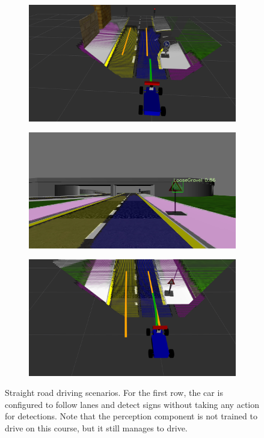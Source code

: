\begin{figure}[h]
\begin{subfigure}[b]{0.45\linewidth}
  \end{subfigure}
  \begin{subfigure}[b]{0.45\linewidth}
    \includegraphics[width=\linewidth]{figures/experiments/straight-or-right-pc.png}
  \end{subfigure}
  \begin{subfigure}[b]{0.45\linewidth}
    \includegraphics[width=\linewidth]{figures/experiments/loose-gravel-img.png}
  \end{subfigure}
  \begin{subfigure}[b]{0.45\linewidth}
    \includegraphics[width=\linewidth]{figures/experiments/loose-gravel-pc.png}
  \end{subfigure}
  \caption[Straight road driving scenarios]{Straight road driving scenarios.
    For the first row, the car is configured to follow lanes and detect signs
    without taking any action for detections. Note that the perception
    component is not trained to drive on this course, but it still manages to
    drive.}
  \label{figure:normal-driving}
\end{figure}

